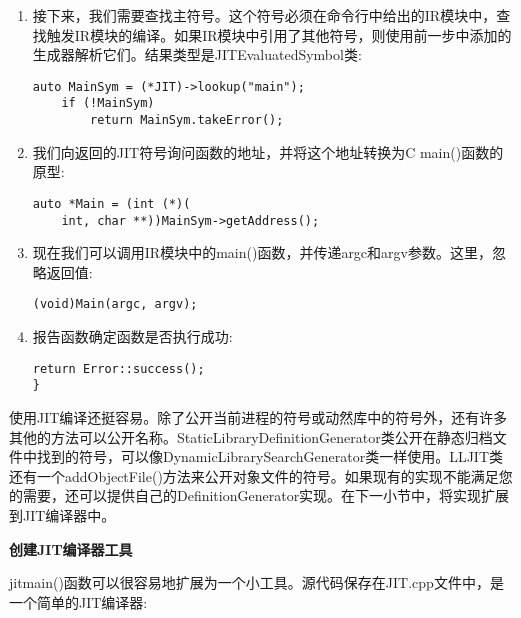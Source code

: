 \begin{enumerate}
\item 接下来，我们需要查找主符号。这个符号必须在命令行中给出的IR模块中，查找触发IR模块的编译。如果IR模块中引用了其他符号，则使用前一步中添加的生成器解析它们。结果类型是JITEvaluatedSymbol类:
\begin{lstlisting}[caption={}]
	auto MainSym = (*JIT)->lookup("main");
	if (!MainSym)
		return MainSym.takeError();
\end{lstlisting}

\item 我们向返回的JIT符号询问函数的地址，并将这个地址转换为C main()函数的原型:
\begin{lstlisting}[caption={}]
auto *Main = (int (*)(
	int, char **))MainSym->getAddress();
\end{lstlisting}

\item 现在我们可以调用IR模块中的main()函数，并传递argc和argv参数。这里，忽略返回值:
\begin{lstlisting}[caption={}]
	(void)Main(argc, argv);
\end{lstlisting}

\item 报告函数确定函数是否执行成功:
\begin{lstlisting}[caption={}]
	return Error::success();
}
\end{lstlisting}

\end{enumerate}

使用JIT编译还挺容易。除了公开当前进程的符号或动然库中的符号外，还有许多其他的方法可以公开名称。StaticLibraryDefinitionGenerator类公开在静态归档文件中找到的符号，可以像DynamicLibrarySearchGenerator类一样使用。LLJIT类还有一个addObjectFile()方法来公开对象文件的符号。如果现有的实现不能满足您的需要，还可以提供自己的DefinitionGenerator实现。在下一小节中，将实现扩展到JIT编译器中。\par

\hspace*{\fill} \par %
\textbf{创建JIT编译器工具}

jitmain()函数可以很容易地扩展为一个小工具。源代码保存在JIT.cpp文件中，是一个简单的JIT编译器:\par

